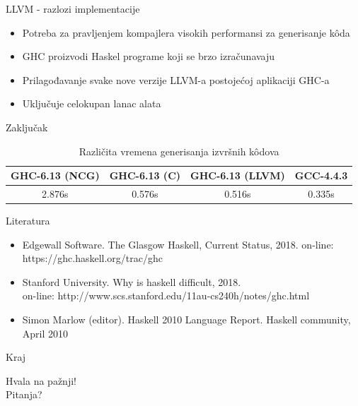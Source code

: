 \documentclass{beamer}
\begin{document}
\begin{frame}[fragile]{LLVM - razlozi implementacije}
	\begin{itemize}
		\item Potreba za pravljenjem kompajlera visokih performansi za generisanje k\^{o}da
		\item GHC proizvodi Haskel programe koji se brzo izračunavaju
		\item Prilagođavanje svake nove verzije LLVM-a postojećoj aplikaciji GHC-a
		\item Uključuje celokupan lanac alata
	\end{itemize}

\end{frame}

\begin{frame}[fragile]{Zaključak}
	\begin{table}[h!]
		\begin{center}
			\caption{Različita vremena generisanja izvršnih k\^{o}dova}
			\begin{tabular}{||c|c|c|c||} \hline
				GHC-6.13 (NCG) & GHC-6.13 (C) & GHC-6.13 (LLVM) & GCC-4.4.3 \\ \hline
				2.876s & 0.576s & 0.516s & 0.335s \\ \hline
			\end{tabular}
			\label{tab:vremena}
		\end{center}
	\end{table}
\end{frame}

\begin{frame}[fragile]{Literatura}
	\begin{itemize}
		\item Edgewall Software. The Glasgow Haskell, Current Status, 2018. on-line: https://ghc.haskell.org/trac/ghc
		\item Stanford University. Why is haskell difficult, 2018. \\on-line: http://www.scs.stanford.edu/11au-cs240h/notes/ghc.html
		\item Simon Marlow (editor). Haskell 2010 Language Report. Haskell community, April 2010
		
		
	\end{itemize}
\end{frame}

\begin{frame}[fragile]{Kraj}
	
	\begin{center}
		Hvala na pažnji! \\
		\vspace{0.5cm}
		Pitanja?
	\end{center}
\end{frame}
\end{document}
